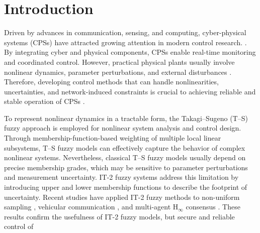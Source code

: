 \documentclass[preprint,review,fleqn,sort&compress,3p]{elsarticle}
\theoremstyle{definition} %
\theoremstyle{definition}%
\newif\ifreviewmarkup
\DeclareRobustCommand{\revdel}[1]{\ifreviewmarkup{\color{revisionred}\hypersetup{linkcolor=revisionred,citecolor=revisionred}#1}\fi}
\DeclareRobustCommand{\revadd}[1]{{\ifreviewmarkup\color{revisiongreen}\hypersetup{linkcolor=revisiongreen,citecolor=revisiongreen}\fi#1}}
\begin{document}
\section{Introduction}%
\label{rev:M02}Driven by advances in communication, sensing, and computing, cyber-physical systems (CPSs) have attracted growing attention in modern control research. \revdel{Applications of CPSs span intelligent transportation, smart grids, and advanced aviation}
\cite{wangMixedVehicleGroup2024,liuFalseDataInjectionAttack2023,dingSurveyModelBasedDistributed2019}.
By integrating cyber and physical components, CPSs enable real-time monitoring and coordinated control. However, practical physical plants usually involve nonlinear dynamics, parameter perturbations, and external disturbances
\cite{chenRobustAdaptiveControl2024,yuanAdaptiveControlNonlinear2024}.
Therefore, developing control methods that can handle nonlinearities, uncertainties, and network-induced constraints is crucial to achieving reliable and stable operation of CPSs
\cite{biAdaptiveDecentralizedFiniteTime2023}.

To represent nonlinear dynamics in a tractable form, the Takagi--Sugeno (T--S)
fuzzy approach \cite{wangStabilityStabilizationTS2021,wangSwitchingAsynchronousControl2024}
is employed for nonlinear system analysis and control design. Through membership-function-based weighting of multiple local linear subsystems, T--S fuzzy models can effectively capture the behavior of complex nonlinear systems. Nevertheless, classical
T--S fuzzy models usually depend on precise membership grades, which may be
sensitive to parameter perturbations and measurement uncertainty. IT-2 fuzzy systems \cite{shengAperiodicSamplingDependentEventTriggeredControl2024,liFiniteTimeDynamicEventTriggered2022}
address this limitation by introducing upper and lower membership functions to
describe the footprint of uncertainty. Recent studies have applied IT-2 fuzzy
methods to non-uniform sampling \cite{liuObserverBasedAdaptiveEventTriggered2024},
vehicular communication \cite{zhangNovelApproachVehicular2025}, and multi-agent
$\mathrm{H}_\infty$ consensus \cite{duIntervalType2Fuzzy2025}. These results confirm
\label{rev:M03}the usefulness of IT-2 fuzzy models, but secure and reliable control of \revdel{IT-2 fuzzy
CPSs under coupled cyber and physical anomalies remains insufficiently developed.}
\end{document}
